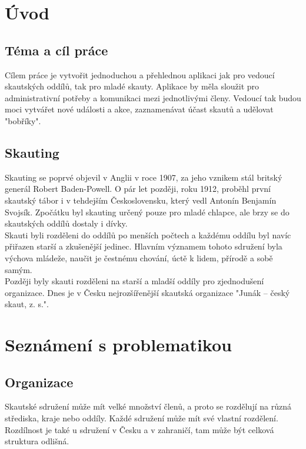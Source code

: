 \documentclass[twoside]{ctuthesis}
\begin{document}
\maketitle

\chapter{Úvod}
\section{Téma a cíl práce}
Cílem práce je vytvořit jednoduchou a přehlednou aplikaci jak pro vedoucí skautských oddílů, tak pro mladé skauty. Aplikace by měla sloužit pro administrativní potřeby a komunikaci mezi jednotlivými členy. Vedoucí tak budou moci vytvářet nové události a akce, zaznamenávat účast skautů a udělovat "bobříky".
\section{Skauting}
Skauting se poprvé objevil v Anglii v roce 1907, za jeho vznikem stál britský generál Robert Baden-Powell. O pár let později, roku 1912, proběhl první skautský tábor i v tehdejším Československu, který vedl Antonín Benjamín Svojsík. Zpočátku byl skauting určený pouze pro mladé chlapce, ale brzy se do skautských oddílů dostaly i dívky. \\

Skauti byli rozděleni do oddílů po menších počtech a každému oddílu byl navíc přiřazen starší a zkušenější jedinec. Hlavním významem tohoto sdružení byla výchova mládeže, naučit je čestnému chování, úctě k lidem, přírodě a sobě samým. \\

Později byly skauti rozděleni na starší a mladší oddíly pro zjednodušení organizace. Dnes je v Česku nejrozšířenější skautská organizace  "Junák – český skaut, z. s.".
\chapter{Seznámení s problematikou}
\section{Organizace}
Skautské sdružení může mít velké množství členů, a proto se rozdělují na různá střediska, kraje nebo oddíly. Každé sdružení může mít své vlastní rozdělení. Rozdílnost je také u sdružení v Česku a v zahraničí, tam může být celková struktura odlišná.
\end{document}
